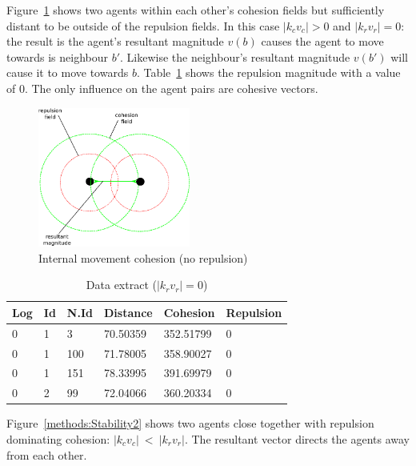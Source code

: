 \documentclass{ieeeaccess}
\begin{document}
Figure~\ref{methods:Stability1} shows two agents within each other's cohesion fields but sufficiently distant to be outside of the repulsion fields. In this case $|k_cv_c| > 0$ and $|k_rv_r| = 0$: the result is the agent's resultant magnitude $v(b)$ causes the agent to move towards is neighbour $b'$. Likewise the neighbour's resultant magnitude $v(b')$ will cause it to move towards $b$. Table~\ref{tab:SampleReplusion0} shows the repulsion magnitude with a value of 0. The only influence on the agent pairs are cohesive vectors. 

\begin{figure}[H]
\begin{center}
\includegraphics[width=5cm]{figures/Stability1}
\end{center}
\caption{Internal movement cohesion (no repulsion)} \label{methods:Stability1}
\end{figure}

\begin{table}[H]
\begin{center}
\begin{tabular}{| l | l | l | l | l | l |}
\hline
Log &	Id &	N.Id &	Distance &	{\color{green}Cohesion} &	{\color{red}Repulsion} 	\\ \hline
0 &	1 &	3 	 & 70.50359 &	{\color{green}352.51799} &	{\color{red}0} \\ \hline
0 &	1 &	100 & 71.78005 &	{\color{green}358.90027} &	{\color{red}0} \\ \hline
0 &	1 &	151 & 78.33995 &	{\color{green}391.69979} &	{\color{red}0} \\ \hline
0 &	2 &	99  &	72.04066 &	{\color{green}360.20334} &	{\color{red}0} \\ 
\hline
\end{tabular}\caption{Data extract ($|k_rv_r| = 0$)} \label{tab:SampleReplusion0}
\end{center}
\end{table}

Figure~\ref{methods:Stability2} shows two agents close together with repulsion dominating cohesion: $|k_cv_c|~<~|k_rv_r|$. The resultant vector directs the agents away from each other. 
\end{document}
